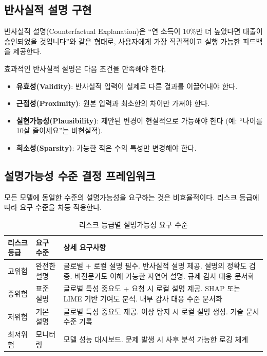 \subsection{반사실적 설명 구현}
\label{sec:10.5.3}

반사실적 설명(Counterfactual Explanation)은 ``연 소득이 10\%만 더 높았다면 대출이 승인되었을 것입니다''와 같은 형태로, 사용자에게 가장 직관적이고 실행 가능한 피드백을 제공한다.

효과적인 반사실적 설명은 다음 조건을 만족해야 한다.
\begin{itemize}
  \item \textbf{유효성(Validity)}: 반사실적 입력이 실제로 다른 결과를 이끌어내야 한다.
  \item \textbf{근접성(Proximity)}: 원본 입력과 최소한의 차이만 가져야 한다.
  \item \textbf{실현가능성(Plausibility)}: 제안된 변경이 현실적으로 가능해야 한다 (예: ``나이를 10살 줄이세요''는 비현실적).
  \item \textbf{희소성(Sparsity)}: 가능한 적은 수의 특성만 변경해야 한다.
\end{itemize}

\subsection{설명가능성 수준 결정 프레임워크}
\label{sec:10.5.4}

모든 모델에 동일한 수준의 설명가능성을 요구하는 것은 비효율적이다. 리스크 등급에 따라 요구 수준을 차등 적용한다.

\begin{table}[htbp]
\centering
\caption{리스크 등급별 설명가능성 요구 수준}
\label{tab:xai_levels}
\begin{tabularx}{\textwidth}{p{2cm}p{3cm}X}
\toprule
\textbf{리스크 등급} & \textbf{요구 수준} & \textbf{상세 요구사항} \\
\midrule
고위험 & 완전한 설명 & 글로벌 + 로컬 설명 필수. 반사실적 설명 제공. 설명의 정확도 검증. 비전문가도 이해 가능한 자연어 설명. 규제 감사 대응 문서화 \\
\midrule
중위험 & 표준 설명 & 글로벌 특성 중요도 + 요청 시 로컬 설명 제공. SHAP 또는 LIME 기반 기여도 분석. 내부 감사 대응 수준 문서화 \\
\midrule
저위험 & 기본 설명 & 글로벌 특성 중요도 제공. 이상 탐지 시 로컬 설명 생성. 기술 문서 수준 기록 \\
\midrule
최저위험 & 모니터링 & 모델 성능 대시보드. 문제 발생 시 사후 분석 가능한 로깅 체계 \\
\bottomrule
\end{tabularx}
\end{table}

